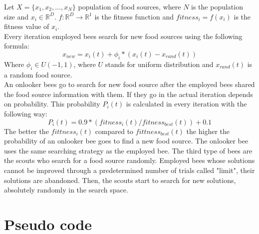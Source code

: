 \documentclass[border=0.2cm]{report}
\newcommand{\R}{\mathbb{R}} %
\begin{document}
\noindent
Let $X=\{x_1,x_2,\ldots,x_N\}$ population of food sources, where $N$ is the population size and $x_i \in \R^D$.
$f: \R^{D}\to\R^1$ is the fitness function and $fitness_i=f(x_i)$ is the fitness value of $x_i$.\\
Every iteration employed bees search for new food sources using the following formula:
\begin{equation}\label{eqn_abc_neighborhood_search}
x_{new}=x_i(t)+\phi_i*(x_i(t)-x_{rand}(t))
\end{equation}
Where $\phi_i \in U(-1, 1)$, where $U$ stands for uniform distribution and $x_{rand}(t)$ is a random food source. \\
An onlooker bees go to search for new food source after the employed bees shared the food source information with them. If they go in the actual iteration depends on probability. This probability $P_i(t)$ is calculated in every iteration with the following way:
\begin{equation}\label{eqn_abc_prob}
P_i(t)=0.9*(fitness_i(t)/fitness_{best}(t))+0.1
\end{equation}
The better the $fittness_i(t)$ compared to $fittness_{best}(t)$ the higher the probability of an onlooker bee goes to find a new food source. The onlooker bee uses the same searching strategy as the employed bee.
The third type of bees are the scouts who search for a food source randomly. Employed bees whose solutions cannot be improved through a predetermined number of trials called "limit", their solutions are abandoned. Then, the scouts start to search for new solutions, absolutely randomly in the search space.


\section{Pseudo code}
\end{document}
